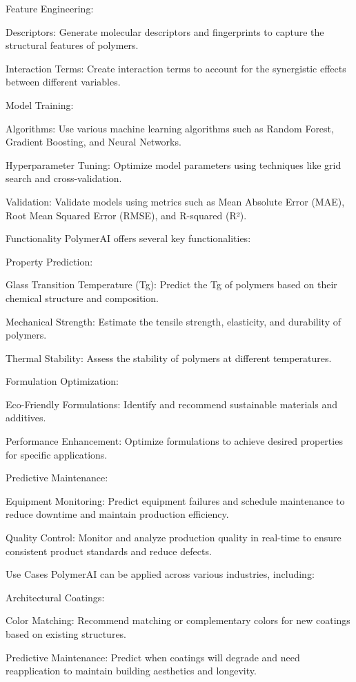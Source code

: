 \documentclass{article}
\begin{document}
	Feature Engineering:
	
	Descriptors: Generate molecular descriptors and fingerprints to capture the structural features of polymers.
	
	Interaction Terms: Create interaction terms to account for the synergistic effects between different variables.
	
	Model Training:
	
	Algorithms: Use various machine learning algorithms such as Random Forest, Gradient Boosting, and Neural Networks.
	
	Hyperparameter Tuning: Optimize model parameters using techniques like grid search and cross-validation.
	
	Validation: Validate models using metrics such as Mean Absolute Error (MAE), Root Mean Squared Error (RMSE), and R-squared (R²).
	
	Functionality
	PolymerAI offers several key functionalities:
	
	Property Prediction:
	
	Glass Transition Temperature (Tg): Predict the Tg of polymers based on their chemical structure and composition.
	
	Mechanical Strength: Estimate the tensile strength, elasticity, and durability of polymers.
	
	Thermal Stability: Assess the stability of polymers at different temperatures.
	
	Formulation Optimization:
	
	Eco-Friendly Formulations: Identify and recommend sustainable materials and additives.
	
	Performance Enhancement: Optimize formulations to achieve desired properties for specific applications.
	
	Predictive Maintenance:
	
	Equipment Monitoring: Predict equipment failures and schedule maintenance to reduce downtime and maintain production efficiency.
	
	Quality Control: Monitor and analyze production quality in real-time to ensure consistent product standards and reduce defects.
	
	Use Cases
	PolymerAI can be applied across various industries, including:
	
	Architectural Coatings:
	
	Color Matching: Recommend matching or complementary colors for new coatings based on existing structures.
	
	Predictive Maintenance: Predict when coatings will degrade and need reapplication to maintain building aesthetics and longevity.
	
\end{document}
